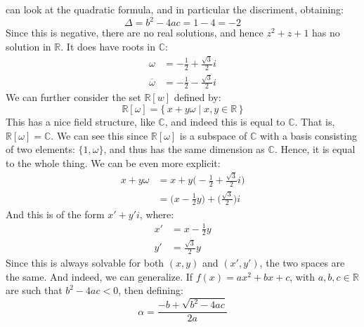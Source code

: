 \documentclass{article}                                                        %
\begin{document}
            can look at the quadratic formula, and in particular the discriment,
            obtaining:
            \begin{equation}
                \Delta=b^{2}-4ac=1-4=\minus{2}
            \end{equation}
            Since this is negative, there are no real solutions, and hence
            $z^{2}+z+1$ has no solution in $\mathbb{R}$. It does have roots in
            $\mathbb{C}$:
            \begin{subequations}
                \begin{align}
                    \omega&=\minus\frac{1}{2}+\frac{\sqrt{3}}{2}i\\
                    \overline{\omega}&=\minus\frac{1}{2}-\frac{\sqrt{3}}{2}i
                \end{align}
            \end{subequations}
            We can further consider the set $\mathbb{R}[w]$ defined by:
            \begin{equation}
                \mathbb{R}[\omega]=\{\,x+y\omega\;|\;x,y\in\mathbb{R}\,\}
            \end{equation}
            This has a nice field structure, like $\mathbb{C}$, and indeed this
            is equal to $\mathbb{C}$. That is, $\mathbb{R}[\omega]=\mathbb{C}$.
            We can see this since $\mathbb{R}[\omega]$ is a subspace of
            $\mathbb{C}$ with a basis consisting of two elements:
            $\{1,\omega\}$, and thus has the same dimension as $\mathbb{C}$.
            Hence, it is equal to the whole thing. We can be even more explicit:
            \begin{align}
                x+y\omega&=x+y\big(\minus\frac{1}{2}+\frac{\sqrt{3}}{2}i\big)\\
                &=\big(x-\frac{1}{2}y\big)+\big(\frac{\sqrt{3}}{2}\big)i
            \end{align}
            And this is of the form $x'+y'i$, where:
            \begin{align}
                x'&=x-\frac{1}{2}y\\
                y'&=\frac{\sqrt{3}}{2}y
            \end{align}
            Since this is always solvable for both $(x,y)$ and $(x',y')$, the
            two spaces are the same. And indeed, we can generalize. If
            $f(x)=ax^{2}+bx+c$, with $a,b,c\in\mathbb{R}$ are such that
            $b^{2}-4ac<0$, then defining:
            \begin{equation}
                \alpha=\frac{\minus{b}+\sqrt{b^{2}-4ac}}{2a}
            \end{equation}
\end{document}
